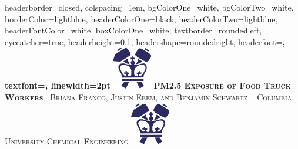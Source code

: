 \documentclass[landscape,paperwidth=42in,paperheight=36in,fontscale=0.32]{baposter} %
\begin{document}
\begin{poster}
{
headerborder=closed, %
colspacing=1em, %
bgColorOne=white, %
bgColorTwo=white, %
borderColor=lightblue, %
headerColorOne=black, %
headerColorTwo=lightblue, %
headerFontColor=white, %
boxColorOne=white, %
textborder=roundedleft, %
eyecatcher=true, %
headerheight=0.1\textheight, %
headershape=roundedright, %
headerfont=\Large\bf\textsc, %
textfont={\setlength{\parindent}{1.5em}}, %
linewidth=2pt %
}
%
{\includegraphics[height=5em]{seas_logo}} %
{\bf\textsc{PM2.5 Exposure of Food Truck Workers}\vspace{0.5em}} %
{\textsc{\ Briana Franco, Justin Ebem, and Benjamin Schwartz \ \hspace{12pt} Columbia University \hspace{12pt} Chemical Engineering}} %
{\includegraphics[height=5em]{seas_logo}} %


\end{poster}
\end{document}
